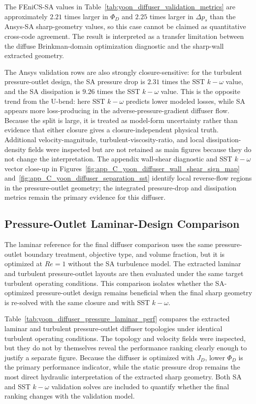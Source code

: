 The FEniCS-SA values in Table~\ref{tab:yoon_diffuser_validation_metrics} are approximately $2.21$ times larger in $\Phi_D$ and $2.25$ times larger in $\Delta p_s$ than the Ansys-SA sharp-geometry values, so this case cannot be claimed as quantitative cross-code agreement. The result is interpreted as a transfer limitation between the diffuse Brinkman-domain optimization diagnostic and the sharp-wall extracted geometry.

The Ansys validation rows are also strongly closure-sensitive: for the turbulent pressure-outlet design, the SA pressure drop is $2.31$ times the SST $k-\omega$ value, and the SA dissipation is $9.26$ times the SST $k-\omega$ value. This is the opposite trend from the U-bend: here SST $k-\omega$ predicts lower modeled losses, while SA appears more loss-producing in the adverse-pressure-gradient diffuser flow. Because the split is large, it is treated as model-form uncertainty rather than evidence that either closure gives a closure-independent physical truth. Additional velocity-magnitude, turbulent-viscosity-ratio, and local dissipation-density fields were inspected but are not retained as main figures because they do not change the interpretation. The appendix wall-shear diagnostic and SST $k-\omega$ vector close-up in Figures~\ref{fig:app_C_yoon_diffuser_wall_shear_sign_map} and~\ref{fig:app_C_yoon_diffuser_separation_sst} identify local reverse-flow regions in the pressure-outlet geometry; the integrated pressure-drop and dissipation metrics remain the primary evidence for this diffuser.

\subsection{Pressure-Outlet Laminar-Design Comparison}
\label{subsec:yoon_diffuser_pressure_laminar}
The laminar reference for the final diffuser comparison uses the same pressure-outlet boundary treatment, objective type, and volume fraction, but it is optimized at $Re=1$ without the SA turbulence model. The extracted laminar and turbulent pressure-outlet layouts are then evaluated under the same target turbulent operating conditions. This comparison isolates whether the SA-optimized pressure-outlet design remains beneficial when the final sharp geometry is re-solved with the same closure and with SST $k-\omega$.

Table~\ref{tab:yoon_diffuser_pressure_laminar_perf} compares the extracted laminar and turbulent pressure-outlet diffuser topologies under identical turbulent operating conditions. The topology and velocity fields were inspected, but they do not by themselves reveal the performance ranking clearly enough to justify a separate figure. Because the diffuser is optimized with $J_D$, lower $\Phi_D$ is the primary performance indicator, while the static pressure drop remains the most direct hydraulic interpretation of the extracted sharp geometry. Both SA and SST $k-\omega$ validation solves are included to quantify whether the final ranking changes with the validation model.

